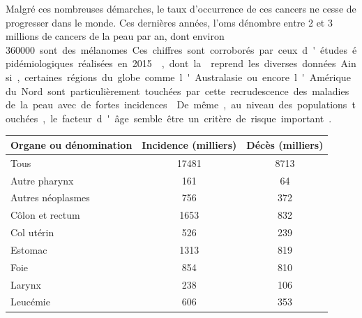 Malgré ces nombreuses démarches, le taux d’occurrence de ces cancers ne cesse de progresser dans le monde. Ces dernières années, l'\gls{oms} dénombre entre 2 et 3 millions de cancers de la peau par an, dont environ \SI{360000} sont des mélanomes. Ces chiffres sont corroborés par ceux d'études épidémiologiques réalisées en 2015~\cite{Vos2016}, dont la  reprend les diverses données. Ainsi, certaines régions du globe comme l'Australasie ou encore l'Amérique du Nord sont particulièrement touchées par cette recrudescence des maladies de la peau avec de fortes incidences~\cite{Karimkhani2017}. De même, au niveau des populations touchées, le facteur d'âge semble être un critère de risque important~\cite{Karimkhani2017}.\par 
    
\begin{table}[H]
    \renewcommand{\bfseries}{\fontseries{b}\selectfont}
    \newrobustcmd{\B}{\bfseries}   
    \centering
    \begin{tabular}{lSS} \toprule
        \textbf{Organe ou dénomination}         & \textbf{Incidence (milliers)} & \textbf{Décès (milliers)} \\ \midrule
        Tous                                    & 17481                         & 8713                      \\
        Autre pharynx                           & 161                           & 64                        \\
        Autres néoplasmes                       & 756                           & 372                       \\
        Côlon et rectum                         & 1653                          & 832                       \\
        Col utérin                              & 526                           & 239                       \\
        Estomac                                 & 1313                          & 819                       \\
        Foie                                    & 854                           & 810                       \\
        Larynx                                  & 238                           & 106                       \\
        Leucémie                                & 606                           & 353                       \\

\end{tabular}
\end{table}
